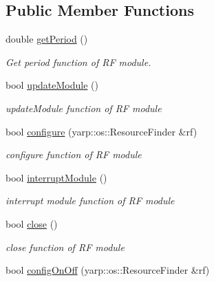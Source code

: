 \subsection*{Public Member Functions}
\begin{DoxyCompactItemize}
\item 
double \hyperlink{classSuperqModule_aeec20285d89c1542d1b91c05c0f82539}{get\-Period} ()
\begin{DoxyCompactList}\small\item\em Get period function of R\-F module. \end{DoxyCompactList}\item 
bool \hyperlink{classSuperqModule_adba43b8815167f66e940bd80ab944af3}{update\-Module} ()\label{classSuperqModule_adba43b8815167f66e940bd80ab944af3}

\begin{DoxyCompactList}\small\item\em update\-Module function of R\-F module \end{DoxyCompactList}\item 
bool \hyperlink{classSuperqModule_a99527edc64196d4a9136416331fd5dd1}{configure} (yarp\-::os\-::\-Resource\-Finder \&rf)\label{classSuperqModule_a99527edc64196d4a9136416331fd5dd1}

\begin{DoxyCompactList}\small\item\em configure function of R\-F module \end{DoxyCompactList}\item 
bool \hyperlink{classSuperqModule_aca14ea8a02d8dbdef9a023da4c336891}{interrupt\-Module} ()\label{classSuperqModule_aca14ea8a02d8dbdef9a023da4c336891}

\begin{DoxyCompactList}\small\item\em interrupt module function of R\-F module \end{DoxyCompactList}\item 
bool \hyperlink{classSuperqModule_a6f88e21fe14a124919ffb07e26c04d15}{close} ()\label{classSuperqModule_a6f88e21fe14a124919ffb07e26c04d15}

\begin{DoxyCompactList}\small\item\em close function of R\-F module \end{DoxyCompactList}\item 
bool \hyperlink{classSuperqModule_a045733615dbe0c97f714dde4ea47a164}{config\-On\-Off} (yarp\-::os\-::\-Resource\-Finder \&rf)\label{classSuperqModule_a045733615dbe0c97f714dde4ea47a164}


\end{DoxyCompactItemize}
